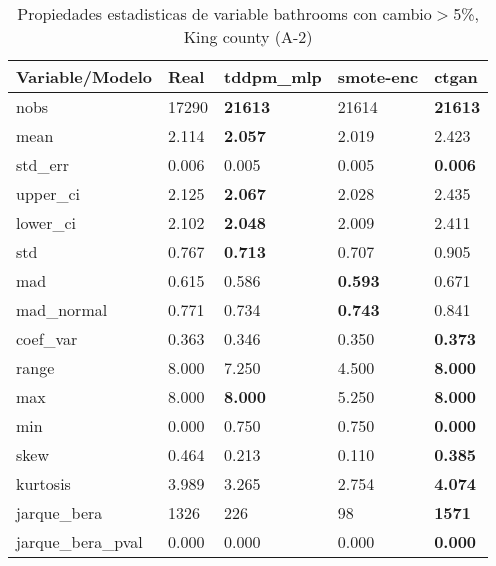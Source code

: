 \begin{table}[H]
\centering
\fontsize{8}{14}\selectfont
\caption{Propiedades estadisticas de variable bathrooms con cambio\ensuremath{>}5\%, King county (A-2)}
\label{table-stats-king county-a-2-bathrooms-short}
\begin{tabular}{|l|m{10em}|m{10em}|m{10em}|m{10em}|}
\hline
 \rowcolor[gray]{0.8}
Variable/Modelo & Real & tddpm\_mlp & smote-enc & ctgan \\
\hline nobs & 17290 & \bfseries 21613 & \cellcolor[rgb]{0.9, 0.54, 0.52} 21614 & \bfseries 21613 \\
\hline mean & 2.114 & \bfseries 2.057 & 2.019 & \cellcolor[rgb]{0.9, 0.54, 0.52} 2.423 \\
\hline std\_err & 0.006 & 0.005 & \cellcolor[rgb]{0.9, 0.54, 0.52} 0.005 & \bfseries 0.006 \\
\hline upper\_ci & 2.125 & \bfseries 2.067 & 2.028 & \cellcolor[rgb]{0.9, 0.54, 0.52} 2.435 \\
\hline lower\_ci & 2.102 & \bfseries 2.048 & 2.009 & \cellcolor[rgb]{0.9, 0.54, 0.52} 2.411 \\
\hline std & 0.767 & \bfseries 0.713 & 0.707 & \cellcolor[rgb]{0.9, 0.54, 0.52} 0.905 \\
\hline mad & 0.615 & 0.586 & \bfseries 0.593 & \cellcolor[rgb]{0.9, 0.54, 0.52} 0.671 \\
\hline mad\_normal & 0.771 & 0.734 & \bfseries 0.743 & \cellcolor[rgb]{0.9, 0.54, 0.52} 0.841 \\
\hline coef\_var & 0.363 & \cellcolor[rgb]{0.9, 0.54, 0.52} 0.346 & 0.350 & \bfseries 0.373 \\
\hline range & 8.000 & 7.250 & \cellcolor[rgb]{0.9, 0.54, 0.52} 4.500 & \bfseries 8.000 \\
\hline max & 8.000 & \bfseries 8.000 & \cellcolor[rgb]{0.9, 0.54, 0.52} 5.250 & \bfseries 8.000 \\
\hline min & 0.000 & \cellcolor[rgb]{0.9, 0.54, 0.52} 0.750 & \cellcolor[rgb]{0.9, 0.54, 0.52} 0.750 & \bfseries 0.000 \\
\hline skew & 0.464 & 0.213 & \cellcolor[rgb]{0.9, 0.54, 0.52} 0.110 & \bfseries 0.385 \\
\hline kurtosis & 3.989 & 3.265 & \cellcolor[rgb]{0.9, 0.54, 0.52} 2.754 & \bfseries 4.074 \\
\hline jarque\_bera & 1326 & 226 & \cellcolor[rgb]{0.9, 0.54, 0.52} 98 & \bfseries 1571 \\
\hline jarque\_bera\_pval & 0.000 & 0.000 & \cellcolor[rgb]{0.9, 0.54, 0.52} 0.000 & \bfseries 0.000 \\

\end{tabular}
\end{table}
